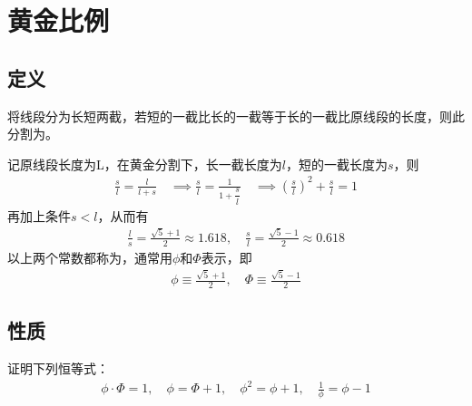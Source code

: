 
\chapter{黄金比例}
\label{ch:golden-ratio}


\section{定义}
\label{sec:golden-ration-defition}

\begin{definition}
  将线段分为长短两截，若短的一截比长的一截等于长的一截比原线段的长度，则此分割为。
\end{definition}

\begin{center}
\end{center}

记原线段长度为L，在黄金分割下，长一截长度为$l$，短的一截长度为$s$，则
\begin{align*}
  \frac sl=\frac l{l+s} \quad\implies \frac sl = \frac1{1+\dfrac sl}\quad\implies
  \left(\frac sl\right)^2 + \frac sl = 1
\end{align*}
再加上条件$s<l$，从而有
\begin{align*}
  \frac ls=\frac{\sqrt5+1}2\approx 1.618, \quad \frac sl=\frac{\sqrt5-1}2\approx 0.618
\end{align*}
以上两个常数都称为，通常用$\phi$和$\Phi$表示，即
\begin{align*}
  \phi\equiv\frac{\sqrt5+1}2,\quad \Phi\equiv\frac{\sqrt5-1}2
\end{align*}


\section{性质}
\label{sec:golden-ration-properties}

\begin{question}
  证明下列恒等式：
  \begin{align*}
    \phi\cdot\Phi=1,\quad \phi=\Phi+1,\quad \phi^2=\phi+1,\quad \frac1\phi=\phi-1
  \end{align*}
\end{question}

